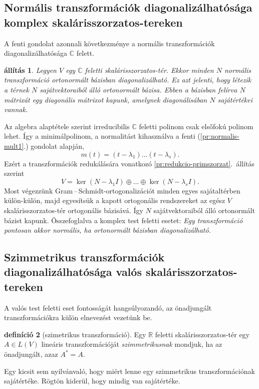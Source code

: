 \documentclass[a4paper, showtrims]{memoir}
\makeatletter
\renewenvironment{proof}[1][\proofname]
    {\par\pushQED{\qed}%
    \normalfont \topsep6\p@\@plus6\p@\relax
    \trivlist
    \item[\hskip\labelsep
        \itshape
    #1\@addpunct{:}]\ignorespaces}
    {\popQED\endtrivlist\@endpefalse}
\theoremstyle{plain}
\newtheorem{proposition}{állítás}[chapter]
\theoremstyle{remark}
\theoremstyle{definition}
\newtheorem{definition}[proposition]{definíció}
\makeatother
\begin{document}
\subsection{Normális transzformációk diagonalizálhatósága komplex skalárisszorzatos-tereken}
A fenti gondolat azonnali következménye a normális transzformációk diagonalizálhatósága $\mathbb{C}$ felett.
\begin{proposition}
	Legyen $V$ egy $\mathbb{C}$ feletti skalárisszorzatos-tér.
	Ekkor minden $N$ normális transzformáció ortonormált bázisban diagonalizálható.
	Ez azt jelenti, hogy létezik a térnek $N$ sajátvektoraiból álló ortonormált bázisa.
	Ebben a bázisban felírva $N$ mátrixát egy diagonális mátrixot kapunk,
	amelynek diagonálisában $N$ sajátértékei vannak.
\end{proposition}
\begin{proof}
	Az algebra alaptétele szerint irreducibilis $\mathbb{C}$ feletti polinom
	csak elsőfokú polinom lehet.
	Így a minimálpolinom, a normalitást kihasználva a fenti (\ref{pr:normalis-mult1}.) gondolat alapján,
	\[
		m\left( t \right)=\left( t-\lambda_1 \right)\dots\left( t-\lambda_s \right).
	\]
	Ezért a transzformációk redukálására vonatkozó \ref{pr:redukcio-primszorzat}.~állítás szerint
	\[
		V=\ker\left( N-\lambda_1I \right)\oplus\dots\oplus\ker\left( N-\lambda_sI \right).
	\]
	Most végezzünk Gram\,--\,Schmidt-ortogonalizációt
	minden egyes sajátaltérben külön-külön,
	majd egyesítsük a kapott ortogonális rendszereket az egész $V$ skalárisszorzatos-tér ortogonális bázisává.
	Így $N$ sajátvektoraiból álló ortonormált bázist kapunk.
\end{proof}
Összefoglalva a komplex test feletti esetet:
\emph{
	Egy transzformáció pontosan akkor normális,
	ha ortonormált bázisban diagonalizálható.
}

\subsection{Szimmetrikus transzformációk diagonalizálhatósága valós skalárisszorzatos-tereken}
A valós test feletti eset fontosságát hangsúlyozandó,
az önadjungált transzformációkra külön elnevezést vezetünk be.
\begin{definition}[szimetrikus transzformáció]
	Egy $\mathbb{R}$ feletti skalárisszorzatos-tér egy $A\in L\left( V \right)$ lineáris transzformációját
	\emph{szimmetrikusnak} mondjuk, ha az önadjungált, azaz  $A^\ast=A$.
\end{definition}
Egy kicsit sem nyilvánvaló, hogy miért lenne egy szimmetrikus transzformációnak sajátértéke.
Rögtön kiderül, hogy mindig van sajátértéke.
\end{document}
